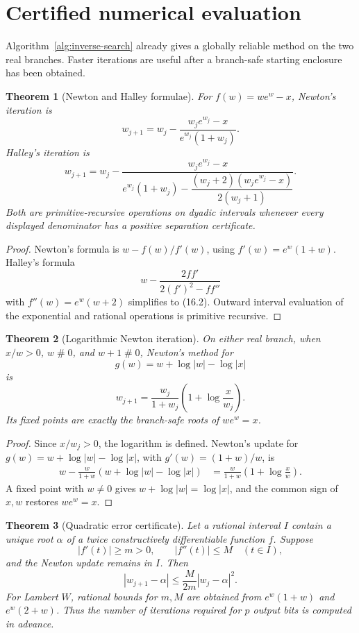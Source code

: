 \documentclass[11pt]{article}
\newtheorem{theorem}{Theorem}[section]
\theoremstyle{definition}
\newcommand{\abs}[1]{\left|#1\right|}
\newcommand{\apart}{\mathrel{\#}}
\begin{document}
\section{Certified numerical evaluation}\label{sec:numerics}

Algorithm~\ref{alg:inverse-search} already gives a globally reliable method on
the two real branches.  Faster iterations are useful after a branch-safe
starting enclosure has been obtained.

\begin{theorem}[Newton and Halley formulae]\label{thm:newton-halley}
For \(f(w)=we^w-x\), Newton's iteration is
\[
 w_{j+1}=w_j-
 \frac{w_je^{w_j}-x}{e^{w_j}(1+w_j)}.
 \tag{16.1}
\]
Halley's iteration is
\[
 w_{j+1}=w_j-
 \frac{w_je^{w_j}-x}
 {e^{w_j}(1+w_j)-
 \dfrac{(w_j+2)(w_je^{w_j}-x)}{2(w_j+1)}}.
 \tag{16.2}
\]
Both are primitive-recursive operations on dyadic intervals whenever every
displayed denominator has a positive separation certificate.
\end{theorem}

\begin{proof}
Newton's formula is \(w-f(w)/f'(w)\), using
\(f'(w)=e^w(1+w)\).  Halley's formula
\[
 w-\frac{2ff'}{2(f')^2-ff''}
\]
with \(f''(w)=e^w(w+2)\) simplifies to (16.2).  Outward interval evaluation
of the exponential and rational operations is primitive recursive.
\end{proof}

\begin{theorem}[Logarithmic Newton iteration]\label{thm:log-newton}
On either real branch, when \(x/w>0\), \(w\apart0\), and \(w+1\apart0\), Newton's method for
\[
 g(w)=w+\log\abs w-\log\abs x
\]
is
\[
 w_{j+1}=
 \frac{w_j}{1+w_j}
 \left(1+\log\frac{x}{w_j}\right).
 \tag{16.3}
\]
Its fixed points are exactly the branch-safe roots of \(we^w=x\).
\end{theorem}

\begin{proof}
Since \(x/w_j>0\), the logarithm is defined.  Newton's update for
\(g(w)=w+\log\abs w-\log\abs x\), with
\(g'(w)=(1+w)/w\), is
\begin{align*}
 w-\frac{w}{1+w}
 (w+\log\abs w-\log\abs x)
 &=\frac{w}{1+w}\left(1+\log\frac{x}{w}\right).
\end{align*}
A fixed point with \(w\ne0\) gives
\(w+\log\abs w=\log\abs x\), and the common sign of \(x,w\) restores
\(we^w=x\).
\end{proof}

\begin{theorem}[Quadratic error certificate]\label{thm:newton-error}
Let a rational interval \(I\) contain a unique root \(\alpha\) of a twice
constructively differentiable function \(f\).  Suppose
\[
 \abs{f'(t)}\ge m>0,
 \qquad \abs{f''(t)}\le M
 \quad(t\in I),
 \tag{16.4}
\]
and the Newton update remains in \(I\).  Then
\[
 \abs{w_{j+1}-\alpha}
 \le\frac{M}{2m}\abs{w_j-\alpha}^2.
 \tag{16.5}
\]
For Lambert \(W\), rational bounds for \(m,M\) are obtained from
\(e^w(1+w)\) and \(e^w(2+w)\).  Thus the number of iterations required for
\(p\) output bits is computed in advance.
\end{theorem}
\end{document}
